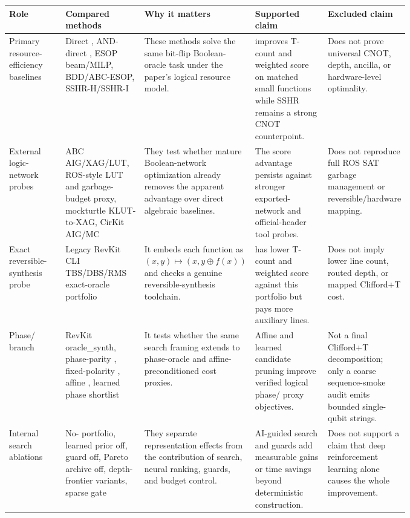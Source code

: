 \begin{tabularx}{\linewidth}{>{\raggedright\arraybackslash}p{0.16\linewidth}>{\raggedright\arraybackslash}p{0.21\linewidth}>{\raggedright\arraybackslash}X>{\raggedright\arraybackslash}p{0.21\linewidth}>{\raggedright\arraybackslash}p{0.19\linewidth}}
\toprule
Role & Compared methods & Why it matters & Supported claim & Excluded claim \\
\midrule
Primary resource-efficiency baselines & Direct \anf{}, AND-direct \anf{}, ESOP beam/MILP, BDD/ABC-ESOP, SSHR-H/SSHR-I & These methods solve the same bit-flip Boolean-oracle task under the paper's logical resource model. & \method{} improves T-count and weighted score on matched small functions while SSHR remains a strong CNOT counterpoint. & Does not prove universal CNOT, depth, ancilla, or hardware-level optimality. \\
External logic-network probes & ABC AIG/XAG/LUT, ROS-style LUT and garbage-budget proxy, mockturtle KLUT-to-XAG, CirKit AIG/MC & They test whether mature Boolean-network optimization already removes the apparent advantage over direct algebraic baselines. & The score advantage persists against stronger exported-network and official-header tool probes. & Does not reproduce full ROS SAT garbage management or reversible/hardware mapping. \\
Exact reversible-synthesis probe & Legacy RevKit CLI TBS/DBS/RMS exact-oracle portfolio & It embeds each function as $(x,y)\mapsto(x,y\oplus f(x))$ and checks a genuine reversible-synthesis toolchain. & \method{} has lower T-count and weighted score against this portfolio but pays more auxiliary lines. & Does not imply lower line count, routed depth, or mapped Clifford+T cost. \\
Phase/\rz{} branch & RevKit oracle\_synth, phase-parity \anf{}, fixed-polarity \fprm{}, affine \fprm{}, learned phase shortlist & It tests whether the same search framing extends to phase-oracle and affine-preconditioned \rz{} cost proxies. & Affine and learned candidate pruning improve verified logical phase/\rz{} proxy objectives. & Not a final Clifford+T decomposition; only a coarse sequence-smoke audit emits bounded single-qubit strings. \\
Internal search ablations & No-\mcts{} portfolio, learned prior off, guard off, Pareto archive off, depth-frontier variants, sparse gate & They separate representation effects from the contribution of search, neural ranking, guards, and budget control. & AI-guided search and guards add measurable gains or time savings beyond deterministic construction. & Does not support a claim that deep reinforcement learning alone causes the whole improvement. \\

\end{tabularx}
